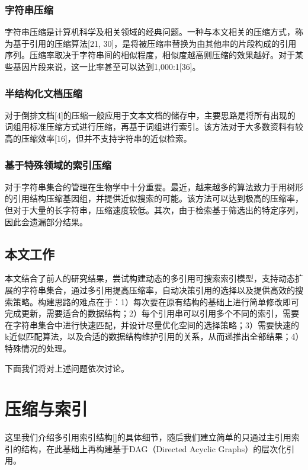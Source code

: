 ﻿\documentclass{sysuthesis}
\begin{document}
\subsection{字符串压缩}
字符串压缩是计算机科学及相关领域的经典问题。一种与本文相关的压缩方式，称为基于引用的压缩算法[21, 30]，是将被压缩串替换为由其他串的片段构成的引用序列。压缩率取决于字符串间的相似程度，相似度越高则压缩的效果越好。对于某些基因片段来说，这一比率甚至可以达到1,000:1[36]。



\subsection{半结构化文档压缩}
对于倒排文档[4]的压缩一般应用于文本文档的储存中，主要思路是将所有出现的词组用标准压缩方式进行压缩，再基于词组进行索引。该方法对于大多数资料有较高的压缩效率[16]，但并不支持字符串的近似检索。



\subsection{基于特殊领域的索引压缩}
对于字符串集合的管理在生物学中十分重要。最近，越来越多的算法致力于用树形的引用结构压缩基因组，并提供近似搜索的可能。该方法可以达到极高的压缩率，但对于大量的长字符串，压缩速度较低。其次，由于检索基于筛选出的特定序列，因此会遗漏部分结果。



\section{本文工作}
本文结合了前人的研究结果，尝试构建动态的多引用可搜索索引模型，支持动态扩展的字符串集合，通过多引用提高压缩率，自动决策引用的选择以及提供高效的搜索策略。构建思路的难点在于：1）每次要在原有结构的基础上进行简单修改即可完成更新，需要适合的数据结构；2）每个引用串可以引用多个不同的索引，需要在字符串集合中进行快速匹配，并设计尽量优化空间的选择策略；3）需要快速的k近似匹配算法，以及合适的数据结构维护引用的关系，从而递推出全部结果；4）特殊情况的处理。\par
下面我们将对上述问题依次讨论。



\chapter{压缩与索引}
这里我们介绍多引用索引结构[]的具体细节，随后我们建立简单的只通过主引用索引的结构，在此基础上再构建基于DAG（Directed Acyclic Graphs）的层次化引用。
\end{document}
